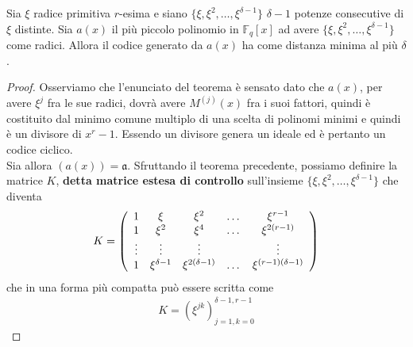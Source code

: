 \begin{teorema}\label{teo:bchDaDelta}
   Sia $\xi$ radice primitiva $r$-esima e siano $\lbrace \xi, \xi^{2}, \dots,\xi^{\delta -1} \rbrace $ $\delta -1$ potenze consecutive di $\xi$ distinte. Sia $a(x)$ il più piccolo polinomio in $\mathbb{F}_{q}[x]$ ad avere  $\lbrace \xi, \xi^{2}, \dots,\xi^{\delta -1} \rbrace $ come radici. Allora il codice generato da $a(x)$ ha come distanza minima al più $\delta$.
\end{teorema}
\begin{proof}
   Osserviamo che l'enunciato del teorema è sensato dato che $a(x)$, per avere $\xi^{j}$ fra le sue radici, dovrà avere $M^{(j)}(x)$ fra i suoi fattori, quindi è costituito dal minimo comune multiplo di una scelta di polinomi minimi e quindi è un divisore di $x^r - 1$. Essendo un divisore genera un ideale ed è pertanto un codice ciclico.\\
   Sia allora $(a(x)) = \mathfrak{a}$. Sfruttando il teorema precedente, possiamo definire la matrice $K$, {\bf detta matrice estesa di controllo} sull'insieme $\lbrace \xi, \xi^{2}, \dots,\xi^{\delta -1} \rbrace $ che diventa
   \begin{align*}
        K =
 	\left(
 	\begin{array} {c c c c c}
 	1 & \xi & \xi^{2} & \dots & \xi^{r-1}   \\
        1 & \xi^{2} & \xi^{4} & \dots & \xi^{2(r-1)}   \\
        \vdots & \vdots & \vdots &  & \vdots   \\
        1 & \xi^{\delta -  1}& \xi^{2(\delta -  1)} & \dots & \xi^{(r-1)(\delta -  1)}
 	\end{array}
 	\right)
     \end{align*}
   che in una forma più compatta può essere scritta come
   \begin{align*}
        K = (\xi^{jk})_{j=1, k = 0 }^{\delta-1, r-1}
    \end{align*}


\end{proof}
